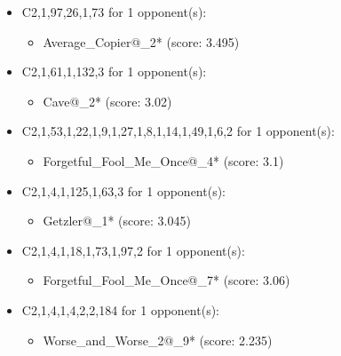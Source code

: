 \begin{appendices}
\begin{itemize}
    \item C2,1,97,26,1,73 for 1 opponent(s):
    \begin{multicols}{3}
         \begin{itemize}
            \item Average\_Copier@\_2* (score: 3.495)
        \end{itemize}
     \end{multicols}
     
    \item C2,1,61,1,132,3 for 1 opponent(s):
    \begin{multicols}{3}
         \begin{itemize}
            \item Cave@\_2* (score: 3.02)
        \end{itemize}
     \end{multicols}
     
    \item C2,1,53,1,22,1,9,1,27,1,8,1,14,1,49,1,6,2 for 1 opponent(s):
    \begin{multicols}{3}
         \begin{itemize}
            \item Forgetful\_Fool\_Me\_Once@\_4* (score: 3.1)
        \end{itemize}
     \end{multicols}
     
    \item C2,1,4,1,125,1,63,3 for 1 opponent(s):
    \begin{multicols}{3}
         \begin{itemize}
            \item Getzler@\_1* (score: 3.045)
        \end{itemize}
     \end{multicols}
     
    \item C2,1,4,1,18,1,73,1,97,2 for 1 opponent(s):
    \begin{multicols}{3}
         \begin{itemize}
            \item Forgetful\_Fool\_Me\_Once@\_7* (score: 3.06)
        \end{itemize}
     \end{multicols}
     
    \item C2,1,4,1,4,2,2,184 for 1 opponent(s):
    \begin{multicols}{3}
         \begin{itemize}
            \item Worse\_and\_Worse\_2@\_9* (score: 2.235)
        \end{itemize}
     \end{multicols}
     

\end{itemize}
\end{appendices}
